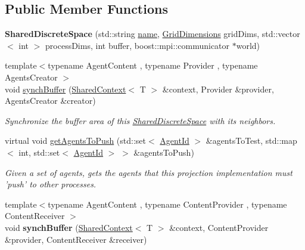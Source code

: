 \subsection*{Public Member Functions}
\begin{DoxyCompactItemize}
\item 
\hypertarget{classrepast_1_1_shared_discrete_space_a18f05b05de925096015b5279a92a7737}{{\bfseries Shared\-Discrete\-Space} (std\-::string \hyperlink{classrepast_1_1_projection_ab60a0ab4f584685780307d7431b61800}{name}, \hyperlink{classrepast_1_1_grid_dimensions}{Grid\-Dimensions} grid\-Dims, std\-::vector$<$ int $>$ process\-Dims, int buffer, boost\-::mpi\-::communicator $\ast$world)}\label{classrepast_1_1_shared_discrete_space_a18f05b05de925096015b5279a92a7737}

\item 
{\footnotesize template$<$typename Agent\-Content , typename Provider , typename Agents\-Creator $>$ }\\void \hyperlink{classrepast_1_1_shared_discrete_space_aadd9357f2c149899b06eea5bf0a73192}{synch\-Buffer} (\hyperlink{classrepast_1_1_shared_context}{Shared\-Context}$<$ T $>$ \&context, Provider \&provider, Agents\-Creator \&creator)
\begin{DoxyCompactList}\small\item\em Synchronize the buffer area of this \hyperlink{classrepast_1_1_shared_discrete_space}{Shared\-Discrete\-Space} with its neighbors. \end{DoxyCompactList}\item 
virtual void \hyperlink{classrepast_1_1_shared_discrete_space_a1f690e82e6b7ea6a279db020e12b4d21}{get\-Agents\-To\-Push} (std\-::set$<$ \hyperlink{classrepast_1_1_agent_id}{Agent\-Id} $>$ \&agents\-To\-Test, std\-::map$<$ int, std\-::set$<$ \hyperlink{classrepast_1_1_agent_id}{Agent\-Id} $>$ $>$ \&agents\-To\-Push)
\begin{DoxyCompactList}\small\item\em Given a set of agents, gets the agents that this projection implementation must 'push' to other processes. \end{DoxyCompactList}\item 
\hypertarget{classrepast_1_1_shared_discrete_space_a0ece724d63d94ee99c3f4312cef656ff}{{\footnotesize template$<$typename Agent\-Content , typename Content\-Provider , typename Content\-Receiver $>$ }\\void {\bfseries synch\-Buffer} (\hyperlink{classrepast_1_1_shared_context}{Shared\-Context}$<$ T $>$ \&context, Content\-Provider \&provider, Content\-Receiver \&receiver)}\label{classrepast_1_1_shared_discrete_space_a0ece724d63d94ee99c3f4312cef656ff}

\end{DoxyCompactItemize}
